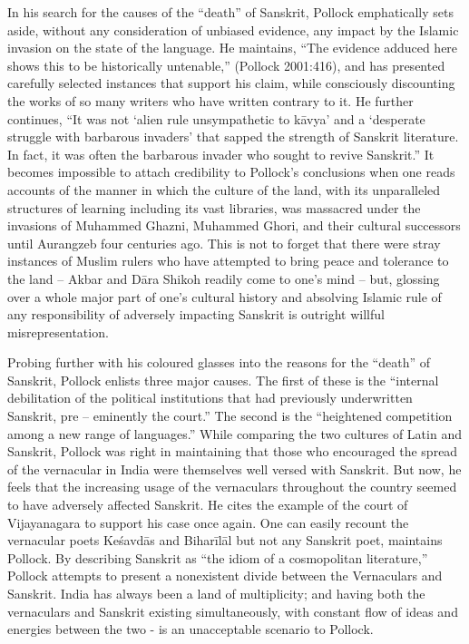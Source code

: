 In his search for the causes of the “death” of Sanskrit, Pollock emphatically sets aside, without any consideration of unbiased evidence, any impact by the Islamic invasion on the state of the language. He maintains, “The evidence adduced here shows this to be historically untenable,” (Pollock 2001:416), and has presented carefully selected instances that support his claim, while consciously discounting the works of so many writers who have written contrary to it. He further continues, “It was not ‘alien rule unsympathetic to kāvya’ and a ‘desperate struggle with barbarous invaders’ that sapped the strength of Sanskrit literature. In fact, it was often the barbarous invader who sought to revive Sanskrit.” It becomes impossible to attach credibility to Pollock’s conclusions when one reads accounts of the manner in which the culture of the land, with its unparalleled structures of learning including its vast libraries, was massacred under the invasions of Muhammed Ghazni, Muhammed Ghori, and their cultural successors until Aurangzeb four centuries ago. This is not to forget that there were stray instances of Muslim rulers who have attempted to bring peace and tolerance to the land – Akbar and Dāra Shikoh readily come to one’s mind – but, glossing over a whole major part of one’s cultural history and absolving Islamic rule of any responsibility of adversely impacting Sanskrit is outright willful misrepresentation.

Probing further with his coloured glasses into the reasons for the “death” of Sanskrit, Pollock enlists three major causes. The first of these is the “internal debilitation of the political institutions that had previously underwritten Sanskrit, pre – eminently the court.” The second is the “heightened competition among a new range of languages.” While comparing the two cultures of Latin and Sanskrit, Pollock was right in maintaining that those who encouraged the spread of the vernacular in India were themselves well versed with Sanskrit. But now, he feels that the increasing usage of the vernaculars throughout the country seemed to have adversely affected Sanskrit. He cites the example of the court of Vijayanagara to support his case once again. One can easily recount the vernacular poets Keśavdās and Biharīlāl but not any Sanskrit poet, maintains Pollock. By describing Sanskrit as “the idiom of a cosmopolitan literature,” Pollock attempts to present a nonexistent divide between the Vernaculars and Sanskrit. India has always been a land of multiplicity; and having both the vernaculars and Sanskrit existing simultaneously, with constant flow of ideas and energies between the two - is an unacceptable scenario to Pollock. 

